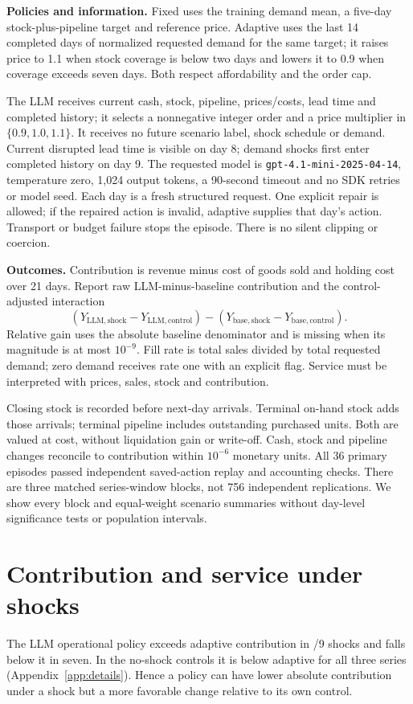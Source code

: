 \documentclass[11pt,a4paper]{article}
\begin{document}
\textbf{Policies and information.} Fixed uses the training demand mean, a five-day stock-plus-pipeline target and reference price. Adaptive uses the last 14 completed days of normalized requested demand for the same target; it raises price to 1.1 when stock coverage is below two days and lowers it to 0.9 when coverage exceeds seven days. Both respect affordability and the order cap.

The LLM receives current cash, stock, pipeline, prices/costs, lead time and completed history; it selects a nonnegative integer order and a price multiplier in $\{0.9,1.0,1.1\}$. It receives no future scenario label, shock schedule or demand. Current disrupted lead time is visible on day 8; demand shocks first enter completed history on day 9. The requested model is \texttt{gpt-4.1-mini-2025-04-14}, temperature zero, 1,024 output tokens, a 90-second timeout and no SDK retries or model seed. Each day is a fresh structured request. One explicit repair is allowed; if the repaired action is invalid, adaptive supplies that day's action. Transport or budget failure stops the episode. There is no silent clipping or coercion.

\textbf{Outcomes.} Contribution is revenue minus cost of goods sold and holding cost over 21 days. Report raw LLM-minus-baseline contribution and the control-adjusted interaction
\[ (Y_{\mathrm{LLM,shock}}-Y_{\mathrm{LLM,control}})-(Y_{\mathrm{base,shock}}-Y_{\mathrm{base,control}}). \]
Relative gain uses the absolute baseline denominator and is missing when its magnitude is at most $10^{-9}$. Fill rate is total sales divided by total requested demand; zero demand receives rate one with an explicit flag. Service must be interpreted with prices, sales, stock and contribution.

Closing stock is recorded before next-day arrivals. Terminal on-hand stock adds those arrivals; terminal pipeline includes outstanding purchased units. Both are valued at cost, without liquidation gain or write-off. Cash, stock and pipeline changes reconcile to contribution within $10^{-6}$ monetary units. All 36 primary episodes passed independent saved-action replay and accounting checks. There are three matched series-window blocks, not 756 independent replications. We show every block and equal-weight scenario summaries without day-level significance tests or population intervals.

\clearpage
\section{Contribution and service under shocks}
The LLM operational policy exceeds adaptive contribution in \RawWins{}/9 shocks and falls below it in seven. In the no-shock controls it is below adaptive for all three series (Appendix~\ref{app:details}). Hence a policy can have lower absolute contribution under a shock but a more favorable change relative to its own control.
\end{document}
